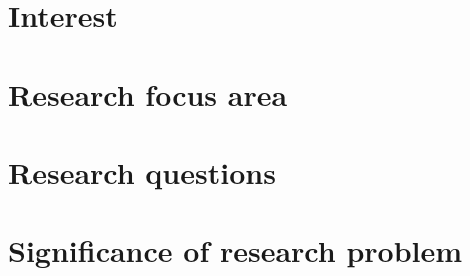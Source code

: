 \documentclass[12pt, twoside]{report}
\title{}
\author{Riddhiman}
\date{\monthyeardate\today}
\begin{document}



\begin{multicols}{2}
 \section*{Interest}
\lipsum[4-5] 

\section*{Research focus area}
\lipsum[6-7] 

\section*{Research questions}
\lipsum[8-9] 

\section*{Significance of research problem}%
\lipsum[10-11]
\end{multicols}
\end{document}
